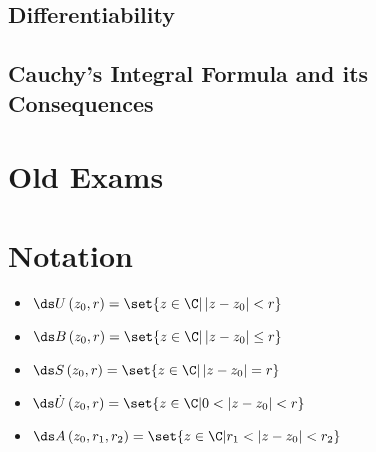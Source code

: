 \documentclass[10pt]{mypackage}
\begin{document}
\subsection{Differentiability}%

\subsection{Cauchy's Integral Formula and its Consequences}%

\section{Old Exams}%
\section{Notation}%
\begin{itemize}
  \item $\ds U\left( z_0,r \right) = \set{z\in \C | \left\vert z-z_0 \right\vert < r}$
  \item $\ds B\left( z_0,r \right) = \set{z\in \C | \left\vert z-z_0 \right\vert \leq r}$
  \item $\ds S\left( z_0,r \right) = \set{z\in \C | \left\vert z-z_0 \right\vert = r}$
  \item $\ds \dot{U}\left( z_0,r \right) = \set{z\in \C | 0 < \left\vert z-z_0 \right\vert < r}$
  \item $\ds A\left( z_0,r_1,r_2 \right) = \set{z\in \C | r_1 < \left\vert z-z_0 \right\vert < r_2}$
\end{itemize}
\end{document}
